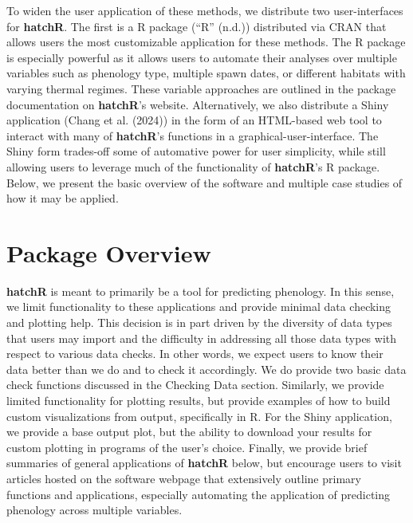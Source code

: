 \documentclass[10pt,a4paper,onecolumn]{article}
\begin{document}
To widen the user application of these methods, we distribute two
user-interfaces for \textbf{hatchR}. The first is a R package ({``R''}
(n.d.)) distributed via CRAN that allows users the most customizable
application for these methods. The R package is especially powerful as
it allows users to automate their analyses over multiple variables such
as phenology type, multiple spawn dates, or different habitats with
varying thermal regimes. These variable approaches are outlined in the
package documentation on \textbf{hatchR}'s website. Alternatively, we
also distribute a Shiny application (Chang et al. (2024)) in the form of
an HTML-based web tool to interact with many of \textbf{hatchR}'s
functions in a graphical-user-interface. The Shiny form trades-off some
of automative power for user simplicity, while still allowing users to
leverage much of the functionality of \textbf{hatchR}'s R package.
Below, we present the basic overview of the software and multiple case
studies of how it may be applied.

\section{Package Overview}\label{package-overview}

\textbf{hatchR} is meant to primarily be a tool for predicting
phenology. In this sense, we limit functionality to these applications
and provide minimal data checking and plotting help. This decision is in
part driven by the diversity of data types that users may import and the
difficulty in addressing all those data types with respect to various
data checks. In other words, we expect users to know their data better
than we do and to check it accordingly. We do provide two basic data
check functions discussed in the Checking Data section. Similarly, we
provide limited functionality for plotting results, but provide examples
of how to build custom visualizations from output, specifically in R.
For the Shiny application, we provide a base output plot, but the
ability to download your results for custom plotting in programs of the
user's choice. Finally, we provide brief summaries of general
applications of \textbf{hatchR} below, but encourage users to visit
articles hosted on the software webpage that extensively outline primary
functions and applications, especially automating the application of
predicting phenology across multiple variables.
\end{document}
